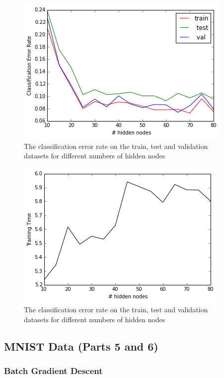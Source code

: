 \documentclass[10pt]{article}
\begin{document}
\begin{figure}
\centering
\includegraphics[scale=0.5]{SGD_toy_data_2_CER.png}
\caption{The classification error rate on the train, test and validation datasets for different numbers of hidden nodes}
\label{SGD_toy_data_2_CER}
\end{figure}
%
\begin{figure}
\centering
\includegraphics[scale=0.5]{SGD_toy_data_2_training_time.png}
\caption{The classification error rate on the train, test and validation datasets for different numbers of hidden nodes}
\label{SGD_toy_data_2_training_time}
\end{figure}





\subsection*{MNIST Data (Parts 5 and 6)}

\subsubsection*{Batch Gradient Descent}
\end{document}
